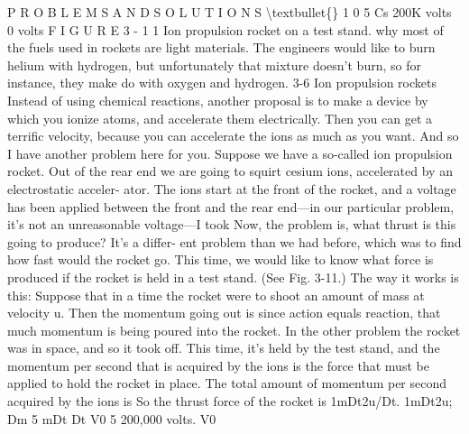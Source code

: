 \documentclass[10pt,oneside]{article}
\begin{document}
P R O B L E M S  A N D  S O L U T I O N S \textbackslash{}textbullet\{\} 1 0 5 Cs 200K volts 0 volts F I G U R E  3 - 1 1 Ion propulsion rocket on a test stand. why most of the fuels used in rockets are light materials. The engineers would like to burn helium with hydrogen, but unfortunately that mixture doesn’t burn, so for instance, they make do with oxygen and hydrogen. 3-6 Ion propulsion rockets Instead of using chemical reactions, another proposal is to make a device by which you ionize atoms, and accelerate them electrically. Then you can get a terrific velocity, because you can accelerate the ions as much as you want. And so I have another problem here for you. Suppose we have a so-called ion propulsion rocket. Out of the rear end we are going to squirt cesium ions, accelerated by an electrostatic acceler- ator. The ions start at the front of the rocket, and a voltage has been applied between the front and the rear end---in our particular problem, it’s not an unreasonable voltage---I took Now, the problem is, what thrust is this going to produce? It’s a differ- ent problem than we had before, which was to find how fast would the rocket go. This time, we would like to know what force is produced if the rocket is held in a test stand. (See Fig. 3-11.) The way it works is this: Suppose that in a time the rocket were to shoot an amount of mass at velocity u. Then the momentum going out is since action equals reaction, that much momentum is being poured into the rocket. In the other problem the rocket was in space, and so it took off. This time, it’s held by the test stand, and the momentum per second that is acquired by the ions is the force that must be applied to hold the rocket in place. The total amount of momentum per second acquired by the ions is So the thrust force of the rocket is 1mDt2u/Dt. 1mDt2u; Dm 5 mDt Dt V0 5 200,000 volts. V0\par
\end{document}

